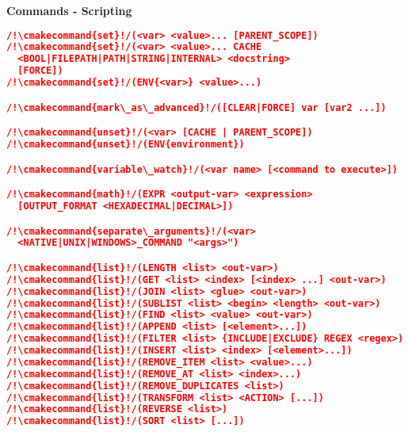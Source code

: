 \documentclass{article}
\newcommand{\cmakecommand}[1]{{\href{https://cmake.org/cmake/help/v3.13/command/#1.html}{#1}}}
\begin{document}
\pagebreak

\begin{minipage}[t]{0.18\linewidth}
\textbf{Commands - Scripting}
\begin{lstlisting}[language=CMake]
/!\cmakecommand{set}!/(<var> <value>... [PARENT_SCOPE])
/!\cmakecommand{set}!/(<var> <value>... CACHE
  <BOOL|FILEPATH|PATH|STRING|INTERNAL> <docstring>
  [FORCE])
/!\cmakecommand{set}!/(ENV{<var>} <value>...)

/!\cmakecommand{mark\_as\_advanced}!/([CLEAR|FORCE] var [var2 ...])

/!\cmakecommand{unset}!/(<var> [CACHE | PARENT_SCOPE])
/!\cmakecommand{unset}!/(ENV{environment})

/!\cmakecommand{variable\_watch}!/(<var name> [<command to execute>])

/!\cmakecommand{math}!/(EXPR <output-var> <expression>
  [OUTPUT_FORMAT <HEXADECIMAL|DECIMAL>])

/!\cmakecommand{separate\_arguments}!/(<var>
  <NATIVE|UNIX|WINDOWS>_COMMAND "<args>")

/!\cmakecommand{list}!/(LENGTH <list> <out-var>)
/!\cmakecommand{list}!/(GET <list> <index> [<index> ...] <out-var>)
/!\cmakecommand{list}!/(JOIN <list> <glue> <out-var>)
/!\cmakecommand{list}!/(SUBLIST <list> <begin> <length> <out-var>)
/!\cmakecommand{list}!/(FIND <list> <value> <out-var>)
/!\cmakecommand{list}!/(APPEND <list> [<element>...])
/!\cmakecommand{list}!/(FILTER <list> {INCLUDE|EXCLUDE} REGEX <regex>)
/!\cmakecommand{list}!/(INSERT <list> <index> [<element>...])
/!\cmakecommand{list}!/(REMOVE_ITEM <list> <value>...)
/!\cmakecommand{list}!/(REMOVE_AT <list> <index>...)
/!\cmakecommand{list}!/(REMOVE_DUPLICATES <list>)
/!\cmakecommand{list}!/(TRANSFORM <list> <ACTION> [...])
/!\cmakecommand{list}!/(REVERSE <list>)
/!\cmakecommand{list}!/(SORT <list> [...])


\end{lstlisting}
\end{minipage}
\end{document}
